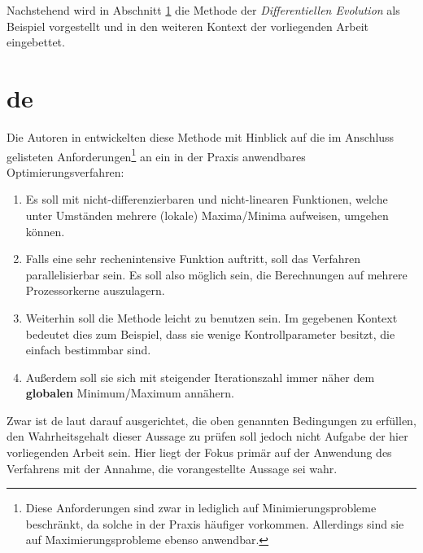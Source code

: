 		Nachstehend wird in Abschnitt \ref{sec:de} die Methode der 
		\textit{Differentiellen Evolution} als Beispiel vorgestellt und in den 
		weiteren Kontext der vorliegenden Arbeit eingebettet.
	

	\section{\gls{de}}
	\label{sec:de}

		Die Autoren in \cite{storn-price-de} entwickelten diese Methode mit 
		Hinblick auf die im Anschluss gelisteten Anforderungen\footnote{Diese 
		Anforderungen sind zwar in \cite{storn-price-de} lediglich auf 
		Minimierungsprobleme beschränkt, da solche in der Praxis häufiger 
		vorkommen. Allerdings sind sie auf Maximierungsprobleme ebenso 
		anwendbar.}
		an ein in der Praxis anwendbares Optimierungsverfahren:
		\begin{enumerate}
			\item Es soll mit nicht-differenzierbaren und nicht-linearen 
			Funktionen, welche unter Umständen mehrere (lokale) Maxima/Minima 
			aufweisen, umgehen können.
			\item Falls eine sehr rechenintensive Funktion auftritt, soll das 
			Verfahren parallelisierbar sein. Es soll also möglich sein, die 
			Berechnungen auf mehrere Prozessorkerne auszulagern.
			\item Weiterhin soll die Methode leicht zu benutzen sein. Im 
			gegebenen Kontext bedeutet dies zum Beispiel, dass sie wenige 
			Kontrollparameter besitzt, die einfach bestimmbar sind.
			\item Außerdem soll sie sich mit steigender Iterationszahl immer 
			näher dem \textbf{globalen} Minimum/Maximum annähern.
		\end{enumerate}
		Zwar ist \gls{de} laut \cite{storn-price-de} darauf ausgerichtet, die 
		oben genannten Bedingungen zu erfüllen, den Wahrheitsgehalt dieser 
		Aussage zu prüfen soll jedoch nicht Aufgabe der hier vorliegenden 
		Arbeit sein. Hier liegt der Fokus primär auf der Anwendung des 
		Verfahrens mit der Annahme, die vorangestellte Aussage sei wahr. 
		
